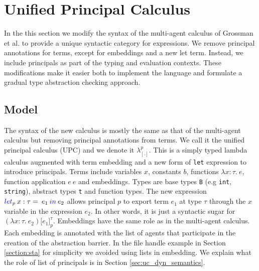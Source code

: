 \documentclass{article}
\newcommand{\emb}[3]{\texttt{[}#1\texttt{]}_{#2}^{#3}}
\newcommand{\tslam}[3]{\lambda #1 : #2. \: #3}
\newcommand{\plet}[5]{\textcolor[rgb]{0,0,1}{let}_{#1} \: {#2}:{#3} = \: #4 \: \textcolor[rgb]{0,0,1}{in} \: #5}
\newcommand\icode[1]{\texttt{#1}}
\newcommand\newcalculus[0]{$\lambda^p_{\left[.\right]}$}
\begin{document}
	\section{Unified Principal Calculus}\label{section:unified_calculus}
	In the this section we modify the syntax of the multi-agent calculus of Grossman et al. to provide a unique syntactic category for expressions. We remove principal annotations for terms, except for embeddings and a new let term. Instead, we include principals as part of the typing and evaluation contexts. These modifications make it easier both to implement the language and formulate a gradual type abstraction checking approach. 
	
\subsection{Model}
	The syntax of the new calculus is mostly the same as that of the multi-agent calculus but removing principal annotations from terms. We call it the unified principal calculus (UPC) and we denote it \newcalculus{}. This is a simply typed lambda calculus augmented with term embedding and a new form of \icode{let} expression to introduce principals. Terms include variables $x$, constants $b$, functions $\tslam{x}{\tau}{e}$, function application $e \: e$ and embeddings. Types are base types \icode{B} (e.g {\tt int}, {\tt string}), abstract types \texttt{t} and function types. The new expression $\plet{p}{x}{\tau}{e_1}{e_2}$ allows principal $p$ to export term $e_1$ at type $\tau$ through the $x$ variable in the expression $e_2$. In other words, it is just a syntactic sugar for $(\tslam{x}{\tau}{e_2})\emb{e_1}{p}{\tau}$. Embeddings have the same role as in the multi-agent calculus. Each embedding is annotated with the list of agents that participate in the creation of the abstraction barrier. In the file handle example in Section \ref{section:sta} for simplicity we avoided using lists in embedding. We explain what the role of list of principals is in Section \ref{sec:uc_dyn_semantics}.	
\end{document}
